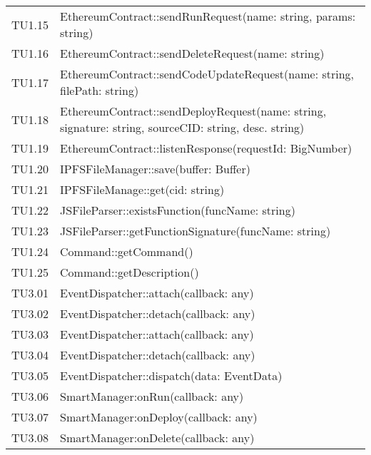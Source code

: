 \begin{longtable}{
		>{\centering}p{}
		>{}p{}}
	TU1.15 & EthereumContract::sendRunRequest(name: string, params: string) \\

	TU1.16 & EthereumContract::sendDeleteRequest(name: string) \\

	TU1.17 & EthereumContract::sendCodeUpdateRequest(name: string, filePath: string) \\

	TU1.18 & EthereumContract::sendDeployRequest(name: string, signature: string, sourceCID: string, desc. string) \\

	TU1.19 & EthereumContract::listenResponse(requestId: BigNumber) \\

	TU1.20 & IPFSFileManager::save(buffer: Buffer) \\

	TU1.21 & IPFSFileManage::get(cid: string) \\

	TU1.22 & JSFileParser::existsFunction(funcName: string) \\

	TU1.23 & JSFileParser::getFunctionSignature(funcName: string) \\

	TU1.24 & Command::getCommand() \\

	TU1.25 & Command::getDescription() \\
	
	
	TU3.01 & EventDispatcher::attach(callback: any) \\
	
	TU3.02 & EventDispatcher::detach(callback: any) \\
	
	TU3.03 & EventDispatcher::attach(callback: any) \\
	
	TU3.04 & EventDispatcher::detach(callback: any) \\
	
	TU3.05 & EventDispatcher::dispatch(data: EventData) \\
	
	TU3.06 & SmartManager:onRun(callback: any) \\
	
	TU3.07 & SmartManager:onDeploy(callback: any) \\
	
	TU3.08 & SmartManager:onDelete(callback: any) \\
	

\end{longtable}
